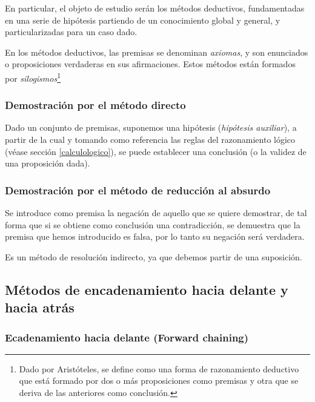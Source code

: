 \documentclass[a4paper, 11pt, titlepage]{article}
\begin{document}
        En particular, el objeto de estudio serán los métodos deductivos, fundamentadas en una 
        serie de hipótesis partiendo de un conocimiento global y general, y particularizadas para 
        un caso dado.

        En los métodos deductivos, las premisas se denominan \textit{axiomas}, y son enunciados 
        o proposiciones verdaderas en sus afirmaciones. Estos métodos están formados por 
        \textit{silogismos}\footnote{
            Dado por Aristóteles, se define como una forma de razonamiento deductivo que está 
            formado por dos o más proposiciones como premisas y otra que se deriva de las anteriores 
            como conclusión.
        }

        \subsubsection{Demostración por el método directo}

            Dado un conjunto de premisas, suponemos una hipótesis (\textit{hipótesis auxiliar}), a 
            partir de la cual y tomando como referencia las reglas del razonamiento lógico (véase 
            sección \ref{calculologico}), se puede establecer una conclusión (o la validez de una 
            proposición dada).

        \subsubsection{Demostración por el método de reducción al absurdo}

            Se introduce como premisa la negación de aquello que se quiere demostrar, de tal 
            forma que si se obtiene como conclusión una contradicción, se demuestra que la premisa 
            que hemos introducido es falsa, por lo tanto su negación será verdadera.

            Es un método de resolución indirecto, ya que debemos partir de una suposición.

    \subsection{Métodos de encadenamiento hacia delante y hacia atrás}

        \subsubsection{Ecadenamiento hacia delante (Forward chaining)}
\end{document}
